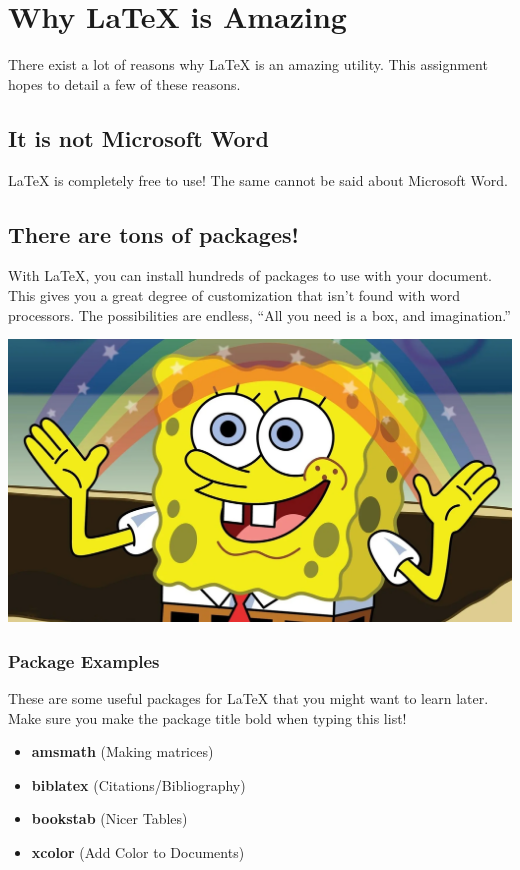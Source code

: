 \section{Why LaTeX is Amazing}
There exist a lot of reasons why LaTeX is an amazing utility. This assignment hopes to detail a few of these reasons.
\subsection{It is not Microsoft Word}
LaTeX is completely free to use! The same cannot be said about Microsoft Word.
\subsection{There are tons of packages!}
With LaTeX, you can install hundreds of packages to use with your document. This gives you a great degree of customization that isn't found with word processors. The possibilities are endless, ``All you need is a box, and imagination.''
\begin{center}
\includegraphics[scale = .17]{imagination.png}    
\end{center}
\subsubsection{Package Examples}
These are some useful packages for LaTeX that you might want to learn later. Make sure you make the package title bold when typing this list!
\begin{itemize}
    \item \textbf{amsmath} (Making matrices)
    \item \textbf{biblatex} (Citations/Bibliography)
    \item \textbf{bookstab} (Nicer Tables)
    \item \textbf{xcolor} (Add Color to Documents)
\end{itemize}

